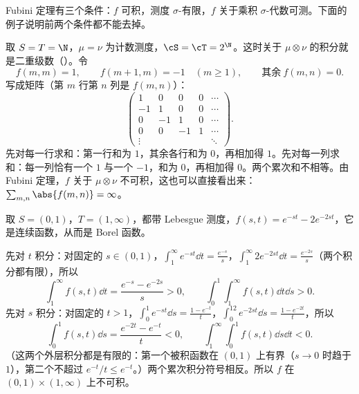 
Fubini 定理有三个条件：$f$ 可积，测度 $\sigma$-有限，$f$ 关于乘积 $\sigma$-代数可测。下面的例子说明前两个条件都不能去掉。

\begin{example}\label{ex:product:double-series}
取 $S=T=\N$，$\mu=\nu$ 为计数测度，$\cS=\cT=2^\N$。这时关于 $\mu\otimes\nu$ 的积分就是二重级数（）。令
\[
f(m,m)=1,\qquad f(m+1,m)=-1\quad(m\geqslant1),\qquad\text{其余}\ f(m,n)=0 .
\]
写成矩阵（第 $m$ 行第 $n$ 列是 $f(m,n)$）：
\[
\begin{pmatrix}1&0&0&0&\cdots\\-1&1&0&0&\cdots\\0&-1&1&0&\cdots\\0&0&-1&1&\cdots\\\vdots&&&&\ddots\end{pmatrix}.
\]
先对每一行求和：第一行和为 $1$，其余各行和为 $0$，再相加得 $1$。先对每一列求和：每一列恰有一个 $1$ 与一个 $-1$，和为 $0$，再相加得 $0$。两个累次和不相等。由 Fubini 定理，$f$ 关于 $\mu\otimes\nu$ 不可积，这也可以直接看出来：$\sum_{m,n}\abs{f(m,n)}=\infty$。
\end{example}

\begin{example}[连续函数的例子]\label{ex:product:exp-counterexample}
取 $S=(0,1)$，$T=(1,\infty)$，都带 Lebesgue 测度，$f(s,t)=e^{-st}-2e^{-2st}$，它是连续函数，从而是 Borel 函数。

先对 $t$ 积分：对固定的 $s\in(0,1)$，$\int_1^\infty e^{-st}\dd t=\frac{e^{-s}}s$，$\int_1^\infty2e^{-2st}\dd t=\frac{e^{-2s}}s$（两个积分都有限），所以
\[
\int_1^\infty f(s,t)\dd t=\frac{e^{-s}-e^{-2s}}s>0,\qquad\int_0^1\int_1^\infty f(s,t)\dd t\dd s>0 .
\]
先对 $s$ 积分：对固定的 $t>1$，$\int_0^1e^{-st}\dd s=\frac{1-e^{-t}}t$，$\int_0^12e^{-2st}\dd s=\frac{1-e^{-2t}}t$，所以
\[
\int_0^1f(s,t)\dd s=\frac{e^{-2t}-e^{-t}}t<0,\qquad\int_1^\infty\int_0^1f(s,t)\dd s\dd t<0 .
\]
（这两个外层积分都是有限的：第一个被积函数在 $(0,1)$ 上有界（$s\to0$ 时趋于 $1$），第二个不超过 $e^{-t}/t\leqslant e^{-t}$。）两个累次积分符号相反。所以 $f$ 在 $(0,1)\times(1,\infty)$ 上不可积。
\end{example}

